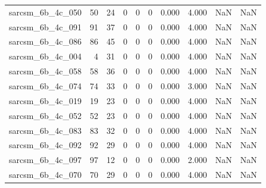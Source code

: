 \documentclass{article}
\begin{document}
\begin{longtable}{lrrrrrrrrr}
sarcsm\_6b\_4c\_050 & 50 & 24 & 0 & 0 & 0 & 0.000 & 4.000 & NaN & NaN \\
sarcsm\_6b\_4c\_091 & 91 & 37 & 0 & 0 & 0 & 0.000 & 4.000 & NaN & NaN \\
sarcsm\_6b\_4c\_086 & 86 & 45 & 0 & 0 & 0 & 0.000 & 4.000 & NaN & NaN \\
sarcsm\_6b\_4c\_004 & 4 & 31 & 0 & 0 & 0 & 0.000 & 4.000 & NaN & NaN \\
sarcsm\_6b\_4c\_058 & 58 & 36 & 0 & 0 & 0 & 0.000 & 4.000 & NaN & NaN \\
sarcsm\_6b\_4c\_074 & 74 & 33 & 0 & 0 & 0 & 0.000 & 3.000 & NaN & NaN \\
sarcsm\_6b\_4c\_019 & 19 & 23 & 0 & 0 & 0 & 0.000 & 4.000 & NaN & NaN \\
sarcsm\_6b\_4c\_052 & 52 & 23 & 0 & 0 & 0 & 0.000 & 4.000 & NaN & NaN \\
sarcsm\_6b\_4c\_083 & 83 & 32 & 0 & 0 & 0 & 0.000 & 4.000 & NaN & NaN \\
sarcsm\_6b\_4c\_092 & 92 & 29 & 0 & 0 & 0 & 0.000 & 4.000 & NaN & NaN \\
sarcsm\_6b\_4c\_097 & 97 & 12 & 0 & 0 & 0 & 0.000 & 2.000 & NaN & NaN \\
sarcsm\_6b\_4c\_070 & 70 & 29 & 0 & 0 & 0 & 0.000 & 4.000 & NaN & NaN \\
\end{longtable}
\end{document}
